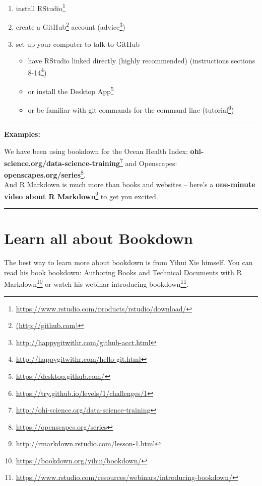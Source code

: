 \documentclass[
]{book}
\providecommand{\tightlist}{%
  \setlength{\itemsep}{0pt}\setlength{\parskip}{0pt}}
\renewcommand{\href}[2]{#2\footnote{\url{#1}}}
\begin{document}
\begin{enumerate}
\def\labelenumi{\arabic{enumi}.}
\tightlist
\item
  install \href{https://www.rstudio.com/products/rstudio/download/}{RStudio}
\item
  create a \href{(http://github.com)}{GitHub} account (\href{http://happygitwithr.com/github-acct.html}{advice})
\item
  set up your computer to talk to GitHub

  \begin{itemize}
  \tightlist
  \item
    have RStudio linked directly (highly recommended) (\href{http://happygitwithr.com/hello-git.html}{instructions sections 8-14})
  \item
    or install the \href{https://desktop.github.com/}{Desktop App}
  \item
    or be familiar with git commands for the command line (\href{https://try.github.io/levels/1/challenges/1}{tutorial})
  \end{itemize}
\end{enumerate}

\begin{center}\rule{0.5\linewidth}{0.5pt}\end{center}

\textbf{Examples:}

We have been using bookdown for the Ocean Health Index: \href{http://ohi-science.org/data-science-training}{\textbf{ohi-science.org/data-science-training}} and Openscapes: \href{https://openscapes.org/series}{\textbf{openscapes.org/series}}.\\
And R Markdown is much more than books and websites -- here's a \href{http://rmarkdown.rstudio.com/lesson-1.html}{\textbf{one-minute video about R Markdown}} to get you excited.

\begin{center}\rule{0.5\linewidth}{0.5pt}\end{center}

\hypertarget{learn-all-about-bookdown}{%
\section{Learn all about Bookdown}\label{learn-all-about-bookdown}}

The best way to learn more about bookdown is from Yihui Xie himself. You can read his book \href{https://bookdown.org/yihui/bookdown/}{bookdown: Authoring Books and Technical Documents with R Markdown} or watch his webinar \href{https://www.rstudio.com/resources/webinars/introducing-bookdown/}{introducing bookdown}.
\end{document}
